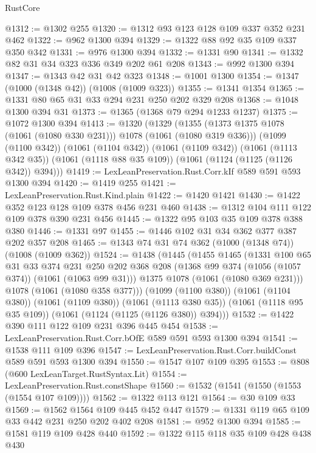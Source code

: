 \begin{lexlean}{RustCore}
\begin{coremodule}
@1312 := @1302 @255
@1320 := @1312 @93 @123 @128 @109 @337 @352 @231 @462
@1322 := @962 @1300 @394
@1329 := @1322 @88 @92 @35 @109 @337 @350 @342
@1331 := @976 @1300 @394
@1332 := @1331 @90
@1341 := @1332 @82 @31 @34 @323 @336 @349 @202 @61 @208
@1343 := @992 @1300 @394
@1347 := @1343 @42 @31 @42 @323
@1348 := @1001 @1300
@1354 := @1347 (@1000 (@1348 @42)) (@1008 (@1009 @323))
@1355 := @1341 @1354
@1365 := @1331 @80 @65 @31 @33 @294 @231 @250 @202 @329 @208
@1368 := @1048 @1300 @394 @31
@1373 := @1365 (@1368 @79 @294 @1233 @1237)
@1375 := @1072 @1300 @394
@1413 := @1320
    (@1329
      (@1355 (@1373 @1375 @1078 (@1061 (@1080 @330 @231))) @1078 (@1061 (@1080 @319 @336)))
      (@1099 (@1100 @342))
      (@1061 (@1104 @342))
      (@1061 (@1109 @342))
      (@1061 (@1113 @342 @35))
      (@1061 (@1118 @88 @35 @109))
      (@1061 (@1124 (@1125 (@1126 @342)) @394)))
@1419 := LexLeanPreservation.Rust.Corr.kIf @589 @591 @593 @1300 @394
@1420 := @1419 @255
@1421 := LexLeanPreservation.Rust.Kind.plain
@1422 := @1420 @1421
@1430 := @1422 @352 @123 @128 @109 @378 @456 @231 @460
@1438 := @1312 @104 @111 @122 @109 @378 @390 @231 @456
@1445 := @1322 @95 @103 @35 @109 @378 @388 @380
@1446 := @1331 @97
@1455 := @1446 @102 @31 @34 @362 @377 @387 @202 @357 @208
@1465 := @1343 @74 @31 @74 @362 (@1000 (@1348 @74)) (@1008 (@1009 @362))
@1524 := @1438
    (@1445
      (@1455
        @1465
        (@1331
          @100
          @65
          @31
          @33
          @374
          @231
          @250
          @202
          @368
          @208
          (@1368 @99 @374 (@1056 (@1057 @374)) (@1061 (@1063 @99 @31)))
          @1375
          @1078
          (@1061 (@1080 @369 @231)))
        @1078
        (@1061 (@1080 @358 @377)))
      (@1099 (@1100 @380))
      (@1061 (@1104 @380))
      (@1061 (@1109 @380))
      (@1061 (@1113 @380 @35))
      (@1061 (@1118 @95 @35 @109))
      (@1061 (@1124 (@1125 (@1126 @380)) @394)))
@1532 := @1422 @390 @111 @122 @109 @231 @396 @445 @454
@1538 := LexLeanPreservation.Rust.Corr.bOfE @589 @591 @593 @1300 @394
@1541 := @1538 @111 @109 @396
@1547 := LexLeanPreservation.Rust.Corr.buildConst @589 @591 @593 @1300 @394
@1550 := @1547 @107 @109 @395
@1553 := @808 (@600 LexLeanTarget.RustSyntax.Lit)
@1554 := LexLeanPreservation.Rust.constShape
@1560 := @1532 (@1541 (@1550 (@1553 (@1554 @107 @109))))
@1562 := @1322 @113 @121
@1564 := @30 @109 @33
@1569 := @1562 @1564 @109 @445 @452 @447
@1579 := @1331 @119 @65 @109 @33 @442 @231 @250 @202 @402 @208
@1581 := @952 @1300 @394
@1585 := @1581 @119 @109 @428 @440
@1592 := @1322 @115 @118 @35 @109 @428 @438 @430

\end{coremodule}
\end{lexlean}
